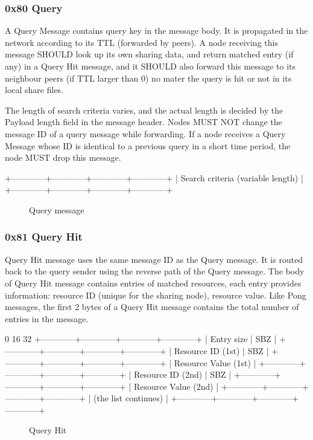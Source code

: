 \documentclass[12pt, a4paper]{article}
\begin{document}
\subsubsection{0x80 Query}
A Query Message contains query key in the message body.
It is propagated in the network according to its TTL (forwarded by peers).
A node receiving this message SHOULD look up its own sharing data, and return matched entry (if any) in a Query Hit message, and it SHOULD also forward this message to its neighbour peers (if TTL larger than 0) no mater the query is hit or not in its local share files.

The length of search criteria varies, and the actual length is decided by the Payload length field in the message header.
Nodes MUST NOT change the message ID of a query message while forwarding.
If a node receives a Query Message whose ID is identical to a previous query in a short time period, the node MUST drop this message.

\begin{verbbox}
+------------+------------+------------+------------+
|     Search criteria (variable length)             |
+------------+------------+------------+------------+
\end{verbbox}

\begin{figure}[h!]
  \centering
  \theverbbox
  \label{header}
  \caption{Query message}
\end{figure}


\subsubsection{0x81 Query Hit}
Query Hit message uses the same message ID as the Query message.
It is routed back to the query sender using the reverse path of the Query message.
The body of Query Hit message contains entries of matched resources, each entry provides information: resource ID (unique for the sharing node), resource value.
Like Pong messages, the first 2 bytes of a Query Hit message contains the total number of entries in the message.

\begin{verbbox}
0                          16                        32
+------------+------------+------------+------------+
|        Entry size       |           SBZ           |
+------------+------------+------------+------------+
|    Resource ID (1st)    |           SBZ           |
+------------+------------+------------+------------+
|                Resource Value (1st)               |
+------------+------------+------------+------------+
|    Resource ID (2nd)    |           SBZ           |
+------------+------------+------------+------------+
|                Resource Value (2nd)               |
+------------+------------+------------+------------+
|    (the list continues)                           |
+------------+------------+------------+------------+
\end{verbbox}
\begin{figure}[h!]
  \centering
  \theverbbox
  \label{header}
  \caption{Query Hit}
\end{figure}
\end{document}
